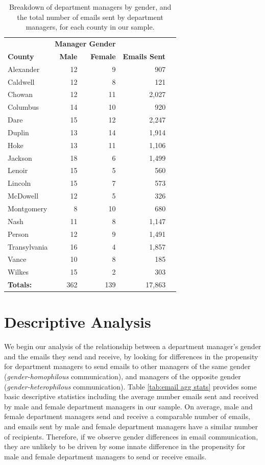 \documentclass{pnastwo}
\begin{document}
\begin{article}
	\begin{table}
	\centering
		\begin{tabular}{lrrrr}
		  \toprule
		  & \multicolumn{2}{c}{\textbf{Manager Gender}} & \\
		  \cmidrule{2-3}
		 \textbf{County} & \textbf{Male} & \textbf{Female} & \textbf{Emails Sent}  \\
		  \midrule
		Alexander & 12 & 9 & 907   \\
		Caldwell & 12 & 8 & 121     \\
		Chowan & 12 & 11 & 2,027   \\
		Columbus & 14 & 10 & 920   \\
		Dare & 15 & 12 & 2,247    \\
		Duplin & 13 & 14 & 1,914    \\
		Hoke & 13 & 11 & 1,106  \\
		Jackson & 18 & 6 & 1,499    \\
		Lenoir & 15 & 5 & 560  \\
		Lincoln & 15 & 7 & 573   \\
		McDowell & 12 & 5 & 326   \\
		Montgomery & 8 & 10 & 680   \\
		Nash & 11 & 8 & 1,147  \\
		Person & 12 & 9 & 1,491   \\
		Transylvania & 16 & 4 & 1,857  \\
		Vance & 10 & 8 & 185   \\
		Wilkes & 15 & 2 & 303   \\
		   \midrule
		   \textbf{Totals:} & 362 & 139 & 17,863 \\
		   \bottomrule
		\end{tabular}
		\caption{\label{tab:county aggregate stats}Breakdown of department managers by gender, and the total number of emails sent by department managers, for each county in our sample.}
	\end{table}



\section{Descriptive Analysis}

We begin our analysis of the relationship between a department manager's gender and the emails they send and receive, by looking for differences in the propensity for department managers to send emails to other managers of the same gender (\emph{gender-homophilous} communication), and managers of the opposite gender (\emph{gender-heterophilous} communication). Table \ref{tab:email agg stats} provides some basic descriptive statistics including the average number emails sent and received by male and female department managers in our sample. On average, male and female department managers send and receive a comparable number of emails, and emails sent by male and female department managers have a similar number of recipients. Therefore, if we observe gender differences in email communication, they are unlikely to be driven by some innate difference in the propensity for male and female department managers to send or receive emails. 
	

\end{article}
\end{document}

